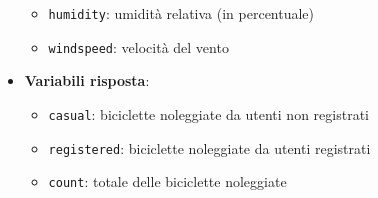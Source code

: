 \begin{itemize}
\begin{itemize}
  \item \texttt{humidity}: umidità relativa (in percentuale)

  \item \texttt{windspeed}: velocità del vento

  \end{itemize}
\item \textbf{Variabili risposta}:
    \begin{itemize}

  \item \texttt{casual}:  biciclette noleggiate da utenti non registrati

  \item \texttt{registered}: biciclette noleggiate da utenti registrati

  \item \texttt{count}: totale delle biciclette noleggiate

    \end{itemize}
\end{itemize}
